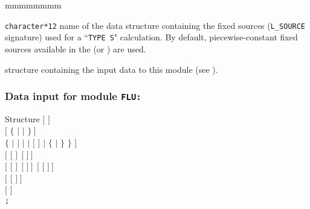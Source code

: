 \begin{ListeDeDescription}{mmmmmmmm}
\item[\dusa{SOUNAM}] {\tt character*12} name of the  data structure
containing the fixed sources ({\tt L\_SOURCE} signature) used for a ``{\tt TYPE S}" calculation.
By default, piecewise-constant fixed sources available in the  (or ) 
are used.

\item[\dstr{descflu}] structure containing the input data to this module (see
).

\end{ListeDeDescription}

\clearpage

\subsubsection{Data input for module {\tt FLU:}}\label{sect:descflu}

\begin{DataStructure}{Structure }
$[$   $]$ \\
$[$  $\{$  $|$  $|$  $\}~]$ \\
 $\{$  $|$  $|$  $|$  $|$  $[$  $]$ $|$
$\{$ $|$  $\}$  $\}$ $]$  \\
$[$  $[$  $]~~[$  $]~]$ \\
$[$  $[$  $]~~[$  $]~]~~[$  $[$  $]~]$ \\
$[$  $[$  $]~]$ \\
$[$     $]$ \\
{\tt ;}
\end{DataStructure}

